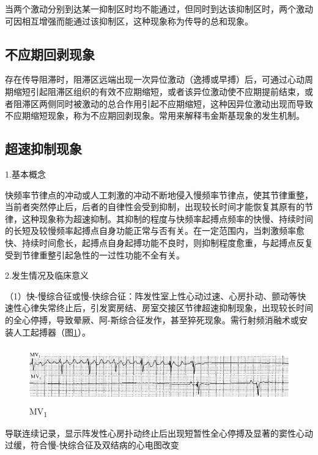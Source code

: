 当两个激动分别到达某一抑制区时均不能通过，但同时到达该抑制区时，两个激动可因相互增强而能通过该抑制区，这种现象称为传导的总和现象。

\protect\hypertarget{text00047.htmlux5cux23subid544}{}{}

\subsection{不应期回剥现象}

存在传导阻滞时，阻滞区远端出现一次异位激动（逸搏或早搏）后，可通过心动周期缩短引起阻滞区组织的有效不应期缩短，或者该异位激动使不应期提前结束，或者阻滞区两侧同时被激动的总合作用引起不应期缩短，这种因异位激动出现而导致不应期缩短现象，称为不应期回剥现象。常用来解释韦金斯基现象的发生机制。

\protect\hypertarget{text00047.htmlux5cux23subid545}{}{}

\subsection{超速抑制现象}

1.基本概念

快频率节律点的冲动或人工刺激的冲动不断地侵入慢频率节律点，使其节律重整，当前者突然停止后，后者的自律性会受到抑制，出现较长时间才能恢复其原有的节律，这种现象称为超速抑制。其抑制的程度与快频率起搏点频率的快慢、持续时间的长短及较慢频率起搏点自身功能正常与否有关。在一定范围内，当刺激频率愈快、持续时间愈长，起搏点自身起搏功能不良时，则抑制程度愈重，与起搏点反复受到节律重整引起急性的一过性功能不全有关。

2.发生情况及临床意义

（1）快-慢综合征或慢-快综合征：阵发性室上性心动过速、心房扑动、颤动等快速性心律失常终止后，引发窦房结、房室交接区节律超速抑制现象，出现较长时间的全心停搏，导致晕厥、阿-斯综合征发作，甚至猝死现象。需行射频消融术或安装人工起搏器（图\ref{fig40-10}）。

\begin{figure}[!htbp]
 \centering
 \includegraphics[width=5.58333in,height=0.94792in]{./images/Image00671.jpg}
 \captionsetup{justification=centering}
 \caption{MV\textsubscript{1}}
 \label{fig40-10}
  \end{figure} 
导联连续记录，显示阵发性心房扑动终止后出现短暂性全心停搏及显著的窦性心动过缓，符合慢-快综合征及双结病的心电图改变

